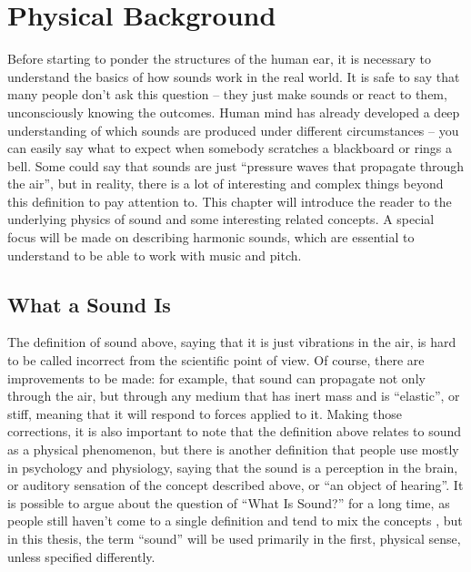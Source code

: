 \chapter{Physical Background}\label{chapter:physics}

Before starting to ponder the structures of the human ear, it is necessary to understand the basics of how sounds work in the real world. It is safe to say that many people don’t ask this question – they just make sounds or react to them, unconsciously knowing the outcomes. Human mind has already developed a deep understanding of which sounds are produced under different circumstances – you can easily say what to expect when somebody scratches a blackboard or rings a bell. Some could say that sounds are just “pressure waves that propagate through the air”, but in reality, there is a lot of interesting and complex things beyond this definition to pay attention to. This chapter will introduce the reader to the underlying physics of sound and some interesting related concepts. A special focus will be made on describing harmonic sounds, which are essential to understand to be able to work with music and pitch.

\section{What a Sound Is}\label{section:physics_sound}

The definition of sound above, saying that it is just vibrations in the air, is hard to be called incorrect from the scientific point of view. Of course, there are improvements to be made: for example, that sound can propagate not only through the air, but through any medium that has inert mass and is “elastic”, or stiff, meaning that it will respond to forces applied to it. Making those corrections, it is also important to note that the definition above relates to sound as a physical phenomenon, but there is another definition that people use mostly in psychology and physiology, saying that the sound is a perception in the brain, or auditory sensation of the concept described above, or “an object of hearing”. It is possible to argue about the question of “What Is Sound?” for a long time, as people still haven’t come to a single definition and tend to mix the concepts \cite{Pasnau1999}, but in this thesis, the term “sound” will be used primarily in the first, physical sense, unless specified differently.\\

